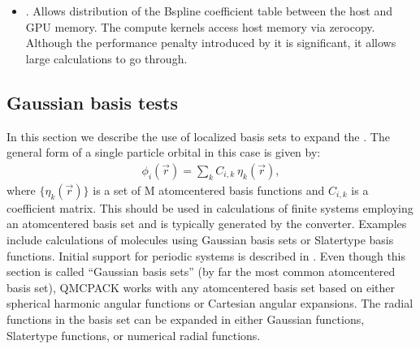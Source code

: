 \documentclass[letterpaper,10pt,english]{sphinxmanual}
\begin{document}
\begin{itemize}
\begin{quote}
\begin{itemize}
\end{itemize}

Summit/SummitDev use “\sphinxhyphen{}alloc\_flags gpumps” for bsub). If MPS is not
detected, sharing will be disabled.
\begin{itemize}
\item {} 
CUDA\_VISIBLE\_DEVICES needs to be properly set to control each rank’s

\end{itemize}

visible CUDA devices (e.g., on OLCF Summit/SummitDev one needs to
create a resource set containing all GPUs with the respective number
of ranks with “jsrun \textendash{}task\sphinxhyphen{}per\sphinxhyphen{}rs Ngpus \sphinxhyphen{}g Ngpus”).
\end{quote}

\item {} 
. Allows distribution of the B\sphinxhyphen{}spline
coefficient table between the host and GPU memory. The compute kernels
access host memory via zero\sphinxhyphen{}copy. Although the performance penalty
introduced by it is significant, it allows large calculations to go
through.

\end{itemize}


\subsection{Gaussian basis tests}
\label{\detokenize{intro_wavefunction:gaussian-basis-tests}}\label{\detokenize{intro_wavefunction:gaussianbasis}}
In this section we describe the use of localized basis sets to expand the . The general form of a single particle orbital in this case is given by:
\begin{equation}\label{equation:intro_wavefunction:eq5}
\begin{split}\phi_i(\vec{r}) = \sum_k C_{i,k} \ \eta_k(\vec{r}),\end{split}
\end{equation}
where \(\{\eta_k(\vec{r})\}\) is a set of M atom\sphinxhyphen{}centered basis
functions and \(C_{i,k}\) is a coefficient matrix. This should be
used in calculations of finite systems employing an atom\sphinxhyphen{}centered basis
set and is typically generated by the  converter. Examples
include calculations of molecules using Gaussian basis sets or
Slater\sphinxhyphen{}type basis functions. Initial support for periodic systems is
described in . Even though this section is called
“Gaussian basis sets” (by far the most common atom\sphinxhyphen{}centered basis set),
QMCPACK works with any atom\sphinxhyphen{}centered basis set based on either spherical
harmonic angular functions or Cartesian angular expansions. The radial
functions in the basis set can be expanded in either Gaussian functions,
Slater\sphinxhyphen{}type functions, or numerical radial functions.
\end{document}
